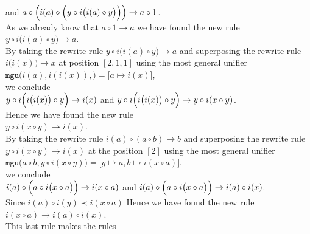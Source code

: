 \quad and \quad
$a \circ \Bigl(i(a) \circ \Bigl(y \circ i\bigl(i(a)\circ y\bigr)\Bigr)\Bigr) \rightarrow a \circ 1$.
\\[0.2cm]
As we already know that $a \circ 1 \rightarrow a$ we have found the new rule
\\[0.2cm]
\hspace*{1.3cm}
$y \circ i\bigl(i(a)\circ y\bigr) \rightarrow a$.
\\[0.2cm]
By taking the rewrite rule $y \circ i\bigl(i(a)\circ y\bigr) \rightarrow a$ and superposing the rewrite rule $i\bigl(i(x)\bigr)
\rightarrow x$ at
position $[2, 1, 1]$ using the most general unifier
\\[0.2cm]
\hspace*{1.3cm}
$\mathtt{mgu}\bigl(i(a), i(i(x)),\bigr) = \bigl[a \mapsto i(x)\bigr]$,
\\[0.2cm]
we conclude
\\[0.2cm]
\hspace*{1.3cm}
$y \circ i\Bigl(i\bigl(i(x)\bigr)\circ y\Bigr) \rightarrow i(x)$ \quad and \quad
$y \circ i\Bigl(i\bigl(i(x)\bigr)\circ y\Bigr) \rightarrow y \circ i(x \circ y)$.
\\[0.2cm]
Hence we have found the new rule
\\[0.2cm]
\hspace*{1.3cm}
$y \circ i(x \circ y) \rightarrow i(x)$.
\\[0.2cm]
By taking the rewrite rule  $i(a) \circ (a \circ b) \rightarrow b$ and superposing the rewrite rule $y \circ i(x \circ y) \rightarrow i(x)$
at the position $[2]$ using the most general unifier
\\[0.2cm]
\hspace*{1.3cm}
$\mathtt{mgu}\bigl(a \circ b, y \circ i(x \circ y)\bigr) = \bigl[y \mapsto a, b \mapsto i(x \circ a)\bigr]$, 
\\[0.2cm]
we conclude
\\[0.2cm]
\hspace*{1.3cm}
$i(a) \circ \Bigl(a \circ i\bigl(x \circ a\bigr)\Bigr) \rightarrow i(x \circ a)$ \quad and \quad
$i(a) \circ \Bigl(a \circ i\bigl(x \circ a\bigr)\Bigr) \rightarrow i(a) \circ i(x)$.
\\[0.2cm]
Since $i(a) \circ i(y) \prec i(x \circ a)$ Hence we have found the new rule
\\[0.2cm]
\hspace*{1.3cm}
$i(x \circ a) \rightarrow i(a) \circ i(x)$.
\\[0.2cm]
This last rule makes the rules
\\[0.2cm]
